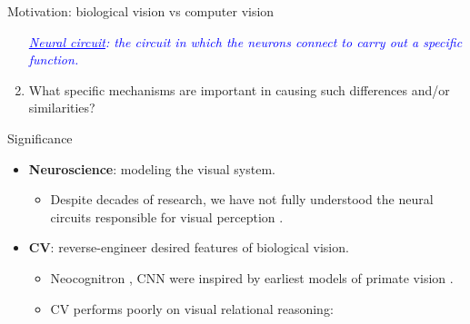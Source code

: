 \documentclass[xcolor={dvipsnames,svgnames}]{beamer}
\begin{document}
\begin{frame}{Motivation: biological vision vs computer vision}
\begin{enumerate}
     \scriptsize{\textit{\textcolor{blue}{\underline{Neural circuit}: the circuit in which the neurons connect to carry out a specific function.}}}
     
    \item  \normalsize{What specific mechanisms are important in causing such differences and/or similarities?}
\end{enumerate}
\end{frame} 

\begin{frame}{Significance}
\begin{itemize}
    \item \textbf{Neuroscience}: modeling the visual system.
    \begin{itemize}
        \item Despite decades of research, we have not fully understood the neural circuits responsible for visual perception \cite{Gwilliams221630}. 
    \end{itemize}
     
    \item \textbf{CV}: reverse-engineer desired features of biological vision.
    \begin{itemize}
        \item Neocognitron \cite{fukushima_neocognitron_1980}, CNN \cite{lenet} were inspired by earliest models of primate vision \cite{hubel_receptive_1962}.
        \item CV performs poorly on visual relational reasoning:
    \end{itemize}
    

\end{itemize}
\end{frame}
\end{document}
